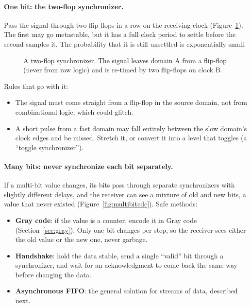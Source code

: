 \paragraph{One bit: the two-flop synchronizer.} Pass the signal through two flip-flops in a row on the receiving clock (Figure~\ref{fig:sync}). The first may go metastable, but it has a full clock period to settle before the second samples it. The probability that it is still unsettled is exponentially small.

\begin{figure}[h]
\centering
{}
\caption{A two-flop synchronizer. The signal leaves domain A from a flip-flop (never from raw logic) and is re-timed by two flip-flops on clock B.}
\label{fig:sync}
\end{figure}

Rules that go with it:
\begin{itemize}
  \item The signal must come straight from a flip-flop in the source domain, not from combinational logic, which could glitch.
  \item A short pulse from a fast domain may fall entirely between the slow domain's clock edges and be missed. Stretch it, or convert it into a level that toggles (a ``toggle synchronizer'').
\end{itemize}

\paragraph{Many bits: never synchronize each bit separately.} If a multi-bit value changes, its bits pass through separate synchronizers with slightly different delays, and the receiver can see a mixture of old and new bits, a value that never existed (Figure~\ref{fig:multibitcdc}). Safe methods:
\begin{itemize}
  \item \textbf{Gray code}: if the value is a counter, encode it in Gray code (Section~\ref{sec:gray}). Only one bit changes per step, so the receiver sees either the old value or the new one, never garbage.
  \item \textbf{Handshake}: hold the data stable, send a single ``valid'' bit through a synchronizer, and wait for an acknowledgment to come back the same way before changing the data.
  \item \textbf{Asynchronous FIFO}: the general solution for streams of data, described next.
\end{itemize}

